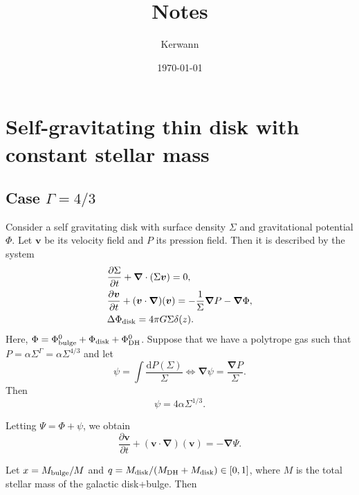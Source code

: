 \documentclass[11pt]{article}
\author{Kerwann}
\date{\today}
\title{Notes}
\newcommand{\bv}{\boldsymbol{v}}
\newcommand{\bnab}{\boldsymbol{\nabla}}
\newcommand{\rd}{\mathrm{d}}
\newcommand{\Phib}{\Phi_{\rm{bulge}}}
\newcommand{\Phid}{\Phi_{\rm{disk}}}
\newcommand{\Phidh}{\Phi_{\rm{DH}}}
\newcommand{\Mb}{M_{\rm{bulge}}}
\newcommand{\Md}{M_{\rm{disk}}}
\newcommand{\Mdh}{M_{\rm{DH}}}
\begin{document}
\maketitle

\tableofcontents


\section{Self-gravitating thin disk with constant stellar mass}
\label{sec:sg_disk_cst_mass}



\subsection{Case $\Gamma=4/3$}

Consider a self gravitating disk with surface density $\Sigma$ and gravitational potential $\Phi$. Let $\bv$ be its velocity field and $P$ its pression field. Then it is described by the system
\begin{align}
&\frac{\partial \Sigma}{\partial t} + \bnab \cdot (\Sigma \bv) = 0 ,\\
&\frac{\partial \bv}{\partial t} + (\bv \cdot \bnab)(\bv) = -\frac{1}{\Sigma} \bnab P - \bnab \Phi ,\\
& \Delta \Phid = 4\pi G \Sigma \delta (z).
\end{align}
Here, $\Phi =\Phib^0+  \Phid +  \Phidh^0$. 
Suppose that we have a polytrope gas such that $P=\alpha \Sigma^{\Gamma}=\alpha \Sigma^{4/3}$ and let
\begin{equation}
\psi = \int \frac{\rd P(\Sigma)}{\Sigma} \Leftrightarrow \bnab \psi = \frac{\bnab P}{\Sigma}.
\end{equation}
 Then
 \begin{equation}
\psi = 4\alpha \Sigma^{1/3}.
\end{equation}
 
 Letting $\Psi = \Phi + \psi$, we obtain
\begin{equation}
\frac{\partial \bv}{\partial t} + (\bv \cdot \bnab)(\bv) = - \bnab \Psi.
\end{equation}

Let $x=\Mb/M$ and $q=\Md/(\Mdh+\Md) \in [0,1]$, where $M$ is the total stellar mass of the galactic disk+bulge.   Then
\end{document}
